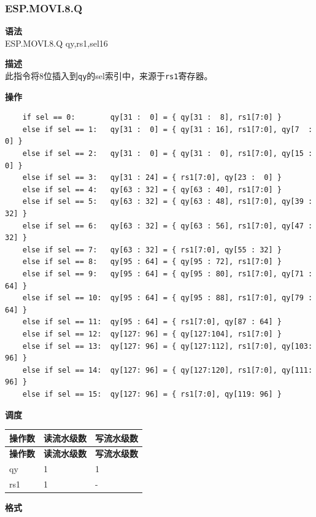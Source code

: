 \newpage
\subsubsection{ESP.MOVI.8.Q}\label{instruction:ESPMOVI8Q}
\textbf{语法}\\
ESP.MOVI.8.Q qy,rs1,sel16

\textbf{描述}\\
此指令将8位插入到\lstinline{qy}的sel索引中，来源于\lstinline{rs1}寄存器。

\textbf{操作}\\
\begin{lstlisting}
    if sel == 0:        qy[31 :  0] = { qy[31 :  8], rs1[7:0] }
    else if sel == 1:   qy[31 :  0] = { qy[31 : 16], rs1[7:0], qy[7  :  0] }
    else if sel == 2:   qy[31 :  0] = { qy[31 :  0], rs1[7:0], qy[15 :  0] }
    else if sel == 3:   qy[31 : 24] = { rs1[7:0], qy[23 :  0] }
    else if sel == 4:   qy[63 : 32] = { qy[63 : 40], rs1[7:0] }
    else if sel == 5:   qy[63 : 32] = { qy[63 : 48], rs1[7:0], qy[39 : 32] }
    else if sel == 6:   qy[63 : 32] = { qy[63 : 56], rs1[7:0], qy[47 : 32] }
    else if sel == 7:   qy[63 : 32] = { rs1[7:0], qy[55 : 32] }
    else if sel == 8:   qy[95 : 64] = { qy[95 : 72], rs1[7:0] }
    else if sel == 9:   qy[95 : 64] = { qy[95 : 80], rs1[7:0], qy[71 : 64] }
    else if sel == 10:  qy[95 : 64] = { qy[95 : 88], rs1[7:0], qy[79 : 64] }
    else if sel == 11:  qy[95 : 64] = { rs1[7:0], qy[87 : 64] }
    else if sel == 12:  qy[127: 96] = { qy[127:104], rs1[7:0] }
    else if sel == 13:  qy[127: 96] = { qy[127:112], rs1[7:0], qy[103: 96] }
    else if sel == 14:  qy[127: 96] = { qy[127:120], rs1[7:0], qy[111: 96] }
    else if sel == 15:  qy[127: 96] = { rs1[7:0], qy[119: 96] }
\end{lstlisting}

\textbf{调度}\\
\begin{longtable}[c]{|l|l|l|}
    \hline
    \rowcolor{lightgray}
    \textbf{操作数} & \textbf{读流水级数} & \textbf{写流水级数} \\\hline
    \endfirsthead
    \hline
    \rowcolor{lightgray}
     \textbf{操作数} & \textbf{读流水级数} & \textbf{写流水级数} \\\hline
    \endhead
    \hline
    \endfoot

  qy & 1 & 1 \\\hline
    rs1 & 1 & -

\end{longtable}

\textbf{格式}\\

